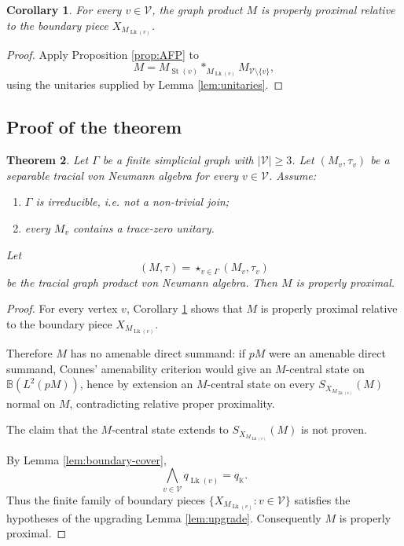 \documentclass[12pt]{article}
\newtheorem{theorem}{Theorem}[section]
\newtheorem{corollary}[theorem]{Corollary}
\theoremstyle{definition}
\newcommand{\V}{\mathcal V}
\newcommand{\Lk}{\operatorname{Lk}}
\newcommand{\St}{\operatorname{St}}
\newcommand{\B}{\mathbb B}
\newcommand{\K}{\mathbb K}
\newcommand{\freeprod}{\mathop{*}}
\newcommand{\review}[1]{\begin{reviewbox}#1\end{reviewbox}}
\begin{document}
\begin{corollary}\label{cor:relative}
For every $v\in\V$, the graph product $M$ is properly proximal relative to the boundary piece $X_{M_{\Lk(v)}}$.
\end{corollary}

\begin{proof}
Apply Proposition \ref{prop:AFP} to
\[
M
=
M_{\St(v)}
\freeprod_{M_{\Lk(v)}}
M_{\V\setminus\{v\}},
\]
using the unitaries supplied by Lemma \ref{lem:unitaries}.
\end{proof}

\subsection{Proof of the theorem}

\begin{theorem}
Let $\Gamma$ be a finite simplicial graph with $|\V|\geq 3$.  Let $(M_v,\tau_v)$ be a separable tracial von Neumann algebra for every $v\in \V$.  Assume:
\begin{enumerate}[label=(\alph*)]
\item $\Gamma$ is irreducible, i.e. not a non-trivial join;
\item every $M_v$ contains a trace-zero unitary.
\end{enumerate}
Let
\[
(M,\tau)=\mathop{\star}_{v\in\Gamma}(M_v,\tau_v)
\]
be the tracial graph product von Neumann algebra.  Then $M$ is properly proximal.
\end{theorem}

\begin{proof}
For every vertex $v$, Corollary \ref{cor:relative} shows that $M$ is properly proximal relative to the boundary piece $X_{M_{\Lk(v)}}$.

Therefore $M$ has no amenable direct summand: if $pM$ were an amenable direct summand, Connes' amenability criterion would give an $M$-central state on $\B(L^2(pM))$, hence by extension an $M$-central state on every $S_{X_{M_{\Lk(v)}}}(M)$ normal on $M$, contradicting relative proper proximality.

\review{The claim that the $M$-central state extends to $S_{X_{M_{\Lk(v)}}}(M)$ is not proven.}

By Lemma \ref{lem:boundary-cover},
\[
\bigwedge_{v\in\V} q_{\Lk(v)}=q_{\K}.
\]
Thus the finite family of boundary pieces $\{X_{M_{\Lk(v)}}:v\in\V\}$ satisfies the hypotheses of the upgrading Lemma \ref{lem:upgrade}.  Consequently $M$ is properly proximal.
\end{proof}
\end{document}
